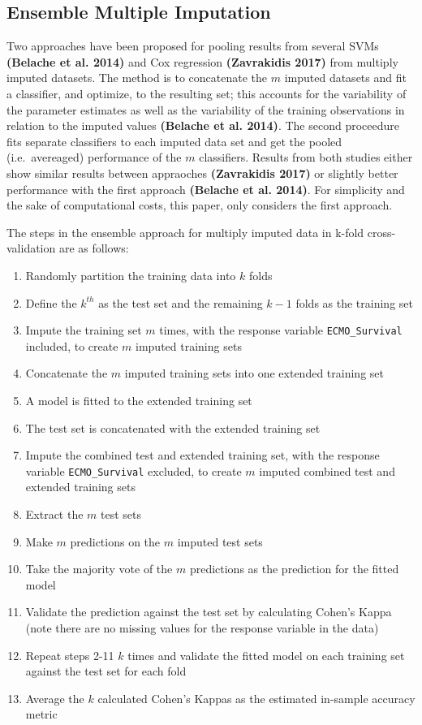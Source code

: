 \documentclass[12pt,]{article}
\providecommand{\tightlist}{%
  \setlength{\itemsep}{0pt}\setlength{\parskip}{0pt}}
\begin{document}
\subsection{Ensemble Multiple
Imputation}\label{ensemble-multiple-imputation}

Two approaches have been proposed for pooling results from several SVMs
\textbf{(Belache et al. 2014)} and Cox regression \textbf{(Zavrakidis
2017)} from multiply imputed datasets. The method is to concatenate the
\(m\) imputed datasets and fit a classifier, and optimize, to the
resulting set; this accounts for the variability of the parameter
estimates as well as the variability of the training observations in
relation to the imputed values \textbf{(Belache et al. 2014)}. The
second proceedure fits separate classifiers to each imputed data set and
get the pooled (i.e.~avereaged) performance of the \(m\) classifiers.
Results from both studies either show similar results between appraoches
\textbf{(Zavrakidis 2017)} or slightly better performance with the first
approach \textbf{(Belache et al. 2014)}. For simplicity and the sake of
computational costs, this paper, only considers the first approach.

The steps in the ensemble approach for multiply imputed data in k-fold
cross-validation are as follows:

\begin{enumerate}
\def\labelenumi{\arabic{enumi}.}
\tightlist
\item
  Randomly partition the training data into \(k\) folds
\item
  Define the \(k^{th}\) as the test set and the remaining \(k-1\) folds
  as the training set
\item
  Impute the training set \(m\) times, with the response variable
  \texttt{ECMO\_Survival} included, to create \(m\) imputed training
  sets
\item
  Concatenate the \(m\) imputed training sets into one extended training
  set
\item
  A model is fitted to the extended training set
\item
  The test set is concatenated with the extended training set
\item
  Impute the combined test and extended training set, with the response
  variable \texttt{ECMO\_Survival} excluded, to create \(m\) imputed
  combined test and extended training sets
\item
  Extract the \(m\) test sets
\item
  Make \(m\) predictions on the \(m\) imputed test sets
\item
  Take the majority vote of the \(m\) predictions as the prediction for
  the fitted model
\item
  Validate the prediction against the test set by calculating Cohen's
  Kappa (note there are no missing values for the response variable in
  the data)
\item
  Repeat steps 2-11 \(k\) times and validate the fitted model on each
  training set against the test set for each fold
\item
  Average the \(k\) calculated Cohen's Kappas as the estimated in-sample
  accuracy metric
\end{enumerate}
\end{document}
